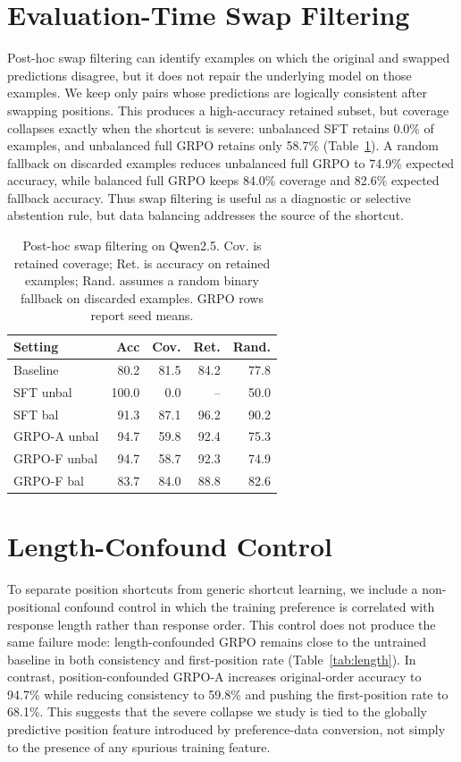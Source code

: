 \documentclass[letterpaper]{article}
\begin{document}
\section{Evaluation-Time Swap Filtering}
\label{app:posthoc}

Post-hoc swap filtering can identify examples on which the original and swapped predictions disagree, but it does not repair the underlying model on those examples. We keep only pairs whose predictions are logically consistent after swapping positions. This produces a high-accuracy retained subset, but coverage collapses exactly when the shortcut is severe: unbalanced SFT retains 0.0\% of examples, and unbalanced full GRPO retains only 58.7\% (Table~\ref{tab:posthoc}). A random fallback on discarded examples reduces unbalanced full GRPO to 74.9\% expected accuracy, while balanced full GRPO keeps 84.0\% coverage and 82.6\% expected fallback accuracy. Thus swap filtering is useful as a diagnostic or selective abstention rule, but data balancing addresses the source of the shortcut.

\begin{table}[H]
\centering
\scriptsize
\setlength{\tabcolsep}{3pt}
\begin{tabular}{@{}lrrrr@{}}
\toprule
\textbf{Setting} & \textbf{Acc} & \textbf{Cov.} & \textbf{Ret.} & \textbf{Rand.} \\
\midrule
Baseline & 80.2 & 81.5 & 84.2 & 77.8 \\
SFT unbal & 100.0 & 0.0 & -- & 50.0 \\
SFT bal & 91.3 & 87.1 & 96.2 & 90.2 \\
GRPO-A unbal & 94.7 & 59.8 & 92.4 & 75.3 \\
GRPO-F unbal & 94.7 & 58.7 & 92.3 & 74.9 \\
GRPO-F bal & 83.7 & 84.0 & 88.8 & 82.6 \\
\bottomrule
\end{tabular}
\caption{Post-hoc swap filtering on Qwen2.5. Cov. is retained coverage; Ret. is accuracy on retained examples; Rand. assumes a random binary fallback on discarded examples. GRPO rows report seed means.}
\label{tab:posthoc}
\end{table}

\section{Length-Confound Control}
\label{app:length}

To separate position shortcuts from generic shortcut learning, we include a non-positional confound control in which the training preference is correlated with response length rather than response order. This control does not produce the same failure mode: length-confounded GRPO remains close to the untrained baseline in both consistency and first-position rate (Table~\ref{tab:length}). In contrast, position-confounded GRPO-A increases original-order accuracy to 94.7\% while reducing consistency to 59.8\% and pushing the first-position rate to 68.1\%. This suggests that the severe collapse we study is tied to the globally predictive position feature introduced by preference-data conversion, not simply to the presence of any spurious training feature.
\end{document}
